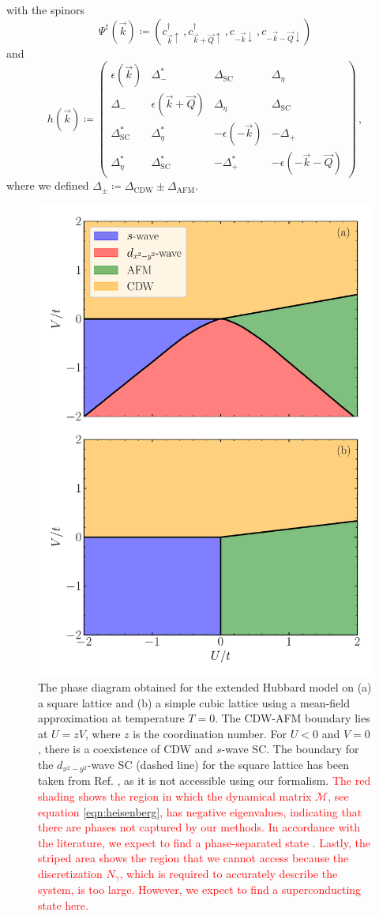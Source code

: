 \documentclass[
    reprint, 
    aps,
    preprintnumbers,
    twocolumn,
    prb,
    superscriptaddress
]{revtex4-2}
\newcommand{\vk}{\vec{k}}
\newcommand{\vQ}{\vec{Q}}
\newcommand{\up}{\uparrow}
\newcommand{\down}{\downarrow}
\newcommand{\kplusQ}{\vk+\vQ}
\newcommand{\kminusQ}{-\vk-\vQ}
\newcommand{\mM}{\mathcal{M}}
\begin{document}
with the spinors
\begin{equation}
    \Psi^\dagger (\vk) \coloneqq  \left( c_{\vk\up}^\dagger\,, c_{\kplusQ\up}^\dagger\,, c_{-\vk\down}\,, c_{\kminusQ\down} \right)
\end{equation}
and 
\begin{equation}
    h(\vk) \coloneqq  \begin{pmatrix}
        \epsilon (\vk) & \Delta_-^* & \Delta_\text{SC} & \Delta_\eta \\
        \Delta_- & \epsilon (\vk + \vQ) & \Delta_\eta & \Delta_\text{SC} \\
        \Delta_\text{SC}^* & \Delta_\eta^* & - \epsilon (-\vk) & - \Delta_+ \\
        \Delta_\eta^* & \Delta_\text{SC}^* & - \Delta_+^* & - \epsilon (-\vk - \vQ)
        \end{pmatrix}\,,
\end{equation}
where we defined $\Delta_\pm \coloneqq \Delta_\text{CDW} \pm \Delta_\text{AFM}$.

\begin{figure}
    \centering
    \includegraphics[width=.48\textwidth]{plots/phase_diagram.pdf}
    \caption{The phase diagram obtained for the extended Hubbard model on 
    (a) a square lattice and (b) a simple cubic lattice using a mean-field approximation at temperature $T=0$.
    The CDW-AFM boundary lies at $U = zV$, where $z$ is the coordination number. 
    For $U<0$ and $V=0$, there is a coexistence of CDW and $s$-wave SC.
    The boundary for the $d_{x^2 - y^2}$-wave SC (dashed line) for the square lattice has been taken from Ref. \cite{Micnas88b}, 
    as it is not accessible using our formalism.
    \textcolor{red}{The red shading shows the region in which the dynamical matrix $\mM$, see equation \eqref{eqn:heisenberg}, has negative eigenvalues, 
    indicating that there are phases not captured by our methods.
    In accordance with the literature, we expect to find a phase-separated state \cite{Linner23}.
    Lastly, the striped area shows the region that we cannot access because the discretization $N_\gamma$, 
    which is required to accurately describe the system, is too large. However, we expect to find a superconducting state here.}}
    \label{fig:phase_diagram}
\end{figure}
\end{document}
